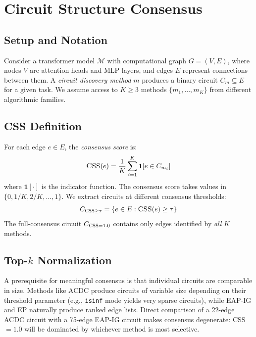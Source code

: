 \documentclass[11pt,a4paper]{article}
\newcommand{\css}{\textsc{CSS}}
\begin{document}
\section{Circuit Structure Consensus}
\label{sec:method}

\subsection{Setup and Notation}

Consider a transformer model $\mathcal{M}$ with computational graph $G = (V, E)$, where nodes $V$ are attention heads and MLP layers, and edges $E$ represent connections between them.
A \emph{circuit discovery method} $m$ produces a binary circuit $C_m \subseteq E$ for a given task.
We assume access to $K \geq 3$ methods $\{m_1, \ldots, m_K\}$ from different algorithmic families.

\subsection{CSS Definition}

For each edge $e \in E$, the \emph{consensus score} is:
\begin{equation}
    \css(e) = \frac{1}{K} \sum_{i=1}^{K} \mathbf{1}[e \in C_{m_i}]
\end{equation}
where $\mathbf{1}[\cdot]$ is the indicator function.
The consensus score takes values in $\{0, 1/K, 2/K, \ldots, 1\}$.
We extract circuits at different consensus thresholds:
\begin{equation}
    C_{\css \geq \tau} = \{e \in E : \css(e) \geq \tau\}
\end{equation}
The full-consensus circuit $C_{\css=1.0}$ contains only edges identified by \emph{all} $K$ methods.

\subsection{Top-$k$ Normalization}
\label{sec:topk}

A prerequisite for meaningful consensus is that individual circuits are comparable in size.
Methods like ACDC produce circuits of variable size depending on their threshold parameter (e.g., \texttt{isinf} mode yields very sparse circuits), while EAP-IG and EP naturally produce ranked edge lists.
Direct comparison of a 22-edge ACDC circuit with a 75-edge EAP-IG circuit makes consensus degenerate: \css{}$=1.0$ will be dominated by whichever method is most selective.
\end{document}
